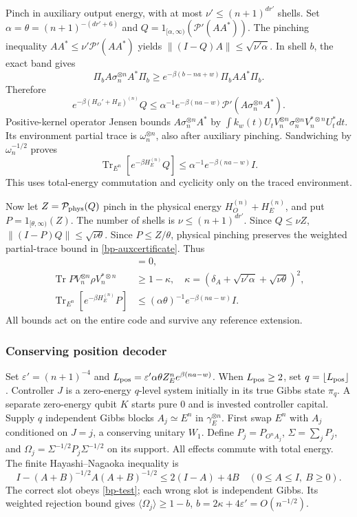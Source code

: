 \documentclass[11pt]{article}
\theoremstyle{definition}
\theoremstyle{remark}
\newcommand{\Tr}{\operatorname{Tr}}
\begin{document}
Pinch in auxiliary output energy, with at most $\nu'\le(n+1)^{dr'}$
shells. Set $\alpha=\theta=(n+1)^{-(dr'+6)}$ and
$Q=1_{[\alpha,\infty)}(\mathcal P'(AA^*))$.
The pinching inequality $AA^*\le\nu'\mathcal P'(AA^*)$ yields
$\|(I-Q)A\|\le\sqrt{\nu'\alpha}$. In shell $b$, the exact band gives
\[
 \Pi_bA\sigma_n^{\otimes n}A^*\Pi_b
 \ge e^{-\beta(b-na+w)}\Pi_bAA^*\Pi_b.
\]
Therefore
\[
 e^{-\beta(H_O'+H_E)^{(n)}}Q
 \le\alpha^{-1}e^{-\beta(na-w)}
                  \mathcal P'(A\sigma_n^{\otimes n}A^*).
\]
Positive-kernel operator Jensen bounds $A\sigma_n^{\otimes n}A^*$
by $\int k_w(t)U_tV_n^{\otimes n}\sigma_n^{\otimes n}
V_n^{*\otimes n}U_t^*dt$. Its environment partial trace is
$\omega_n^{\otimes n}$, also after auxiliary pinching.
Sandwiching by $\omega_n^{-1/2}$ proves
\begin{equation}\label{bp-auxcertificate}
 \Tr_{E^n}[e^{-\beta H_E^{(n)}}Q]
       \le\alpha^{-1}e^{-\beta(na-w)}I.
\end{equation}
This uses total-energy commutation and cyclicity only on the traced
environment.

Now let $Z=\mathcal P_{\rm phys}(Q)$ pinch in the physical energy
$H_O^{(n)}+H_E^{(n)}$, and put $P=1_{[\theta,\infty)}(Z)$.
The number of shells is $\nu\le(n+1)^{dr'}$.
Since $Q\le\nu Z$, $\|(I-P)Q\|\le\sqrt{\nu\theta}$.
Since $P\le Z/\theta$, physical pinching preserves the weighted
partial-trace bound in \eqref{bp-auxcertificate}. Thus
\begin{align}
 [P,H_O^{(n)}+H_E^{(n)}]&=0,\nonumber\\
 \Tr PV_n^{\otimes n}\rho V_n^{*\otimes n}
 &\ge1-\kappa,\quad
 \kappa=(\delta_A+\sqrt{\nu'\alpha}+\sqrt{\nu\theta})^2,\label{bp-test}\\
 \Tr_{E^n}[e^{-\beta H_E^{(n)}}P]
 &\le(\alpha\theta)^{-1}e^{-\beta(na-w)}I.\nonumber
\end{align}
All bounds act on the entire code and survive any reference extension.


\subsubsection{Conserving position decoder}
Set $\varepsilon'=(n+1)^{-4}$ and
$L_{\rm pos}=\varepsilon'\alpha\theta Z_E^n e^{\beta(na-w)}$.
When $L_{\rm pos}\ge2$, set $q=\lfloor L_{\rm pos}\rfloor$.
Controller $J$ is a zero-energy $q$-level system initially in its
true Gibbs state $\pi_q$. A separate zero-energy qubit $K$ starts
pure $0$ and is invested controller capital. Supply $q$ independent
Gibbs blocks $A_j\simeq E^n$ in $\gamma_E^{\otimes n}$.
First swap $E^n$ with $A_j$ conditioned on $J=j$, a conserving
unitary $W_1$. Define $P_j=P_{O^nA_j}$,
$\Sigma=\sum_jP_j$, and
$\Omega_j=\Sigma^{-1/2}P_j\Sigma^{-1/2}$ on its support.
All effects commute with total energy. The finite
Hayashi--Nagaoka inequality is
\[
 I-(A+B)^{-1/2}A(A+B)^{-1/2}\le2(I-A)+4B
 \quad(0\le A\le I,\ B\ge0).
\]
The correct slot obeys \eqref{bp-test}; each wrong slot is independent
Gibbs. Its weighted rejection bound gives
$\langle\Omega_j\rangle\ge1-b$,
$b=2\kappa+4\varepsilon'=O(n^{-1/2})$.
\end{document}
